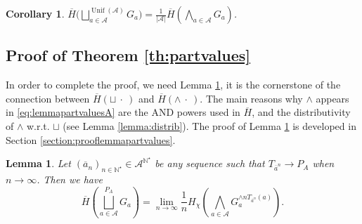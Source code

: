 \documentclass[conference,a4paper]{IEEEtran}
\DeclareMathOperator*{\Unif}{Unif}
\newtheorem{lemma}{Lemma}
\newtheorem{corollary}[theorem]{Corollary}
\begin{document}

\begin{corollary}\label{cor:unif}
$\overline{H}\big(\bigsqcup_{a \in \mathcal{A}}^{\Unif(\mathcal{A})} G_a\big) = \frac{1}{|\mathcal{A}|}\overline{H}\left(\bigwedge_{a \in \mathcal{A}} G_a\right)$.
\end{corollary}

\subsection{Proof of Theorem \ref{th:partvalues}}\label{section:proofthpartvalues}

In order to complete the proof, we need Lemma \ref{lemma:partvalues}, it is the cornerstone of the connection between $\overline{H}(\sqcup \:\cdot\:)$ and $\overline{H}(\wedge \:\cdot\:)$. The main reasons why $\wedge$ appears in \eqref{eq:lemmapartvaluesA} are the AND powers used in $\overline{H}$, and the distributivity of $\wedge$ w.r.t. $\sqcup$ (see Lemma \ref{lemma:distrib}). The proof of Lemma \ref{lemma:partvalues} is developed in Section \ref{section:prooflemmapartvalues}.

\begin{lemma}\label{lemma:partvalues}
    Let $(\overline{a}_n)_{n \in \mathbb{N}^\star} \in \mathcal{A}^{\mathbb{N}^\star}$ be any sequence such that $T_{\overline{a}^n} \rightarrow P_A$ when $n \rightarrow \infty$. Then we have
    \begin{equation}
        \overline{H}\left(\bigsqcup_{a \in \mathcal{A}}^{P_A} G_a \right) = \lim_{n \rightarrow \infty} \frac{1}{n}H_\chi\left(\bigwedge_{a \in \mathcal{A}} G_a^{\wedge n T_{\overline{a}^n} (a)}\right).\label{eq:lemmapartvaluesA}
    \end{equation}
\end{lemma}
\end{document}
